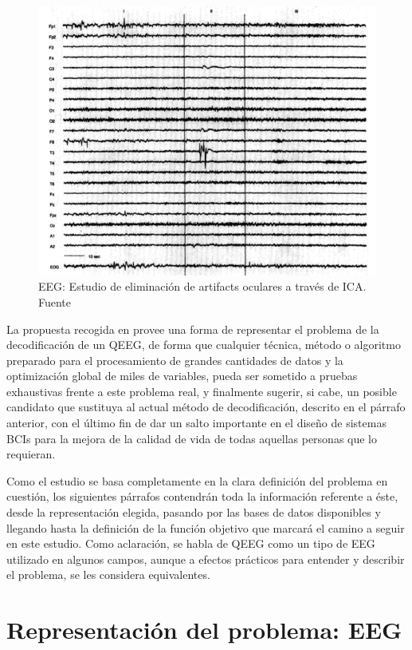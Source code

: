 \begin{figure}[h]
	\centering
	\includegraphics[scale=0.45]{imagenes/EEGData}
	\caption{EEG: Estudio de eliminación de artifacts oculares a través de ICA. Fuente \cite{EEG-Eye}} 
	\label{fig:EEGData}
\end{figure}

La propuesta recogida en \cite{EvolutionaryBigOpt} provee una forma de representar el problema de la decodificación de un QEEG, de forma que cualquier técnica, método o algoritmo preparado para el procesamiento de grandes cantidades de datos y la optimización global de miles de variables, pueda ser sometido a pruebas exhaustivas frente a este problema real, y finalmente sugerir, si cabe, un posible candidato que sustituya al actual método de decodificación, descrito en el párrafo anterior, con el último fin de dar un salto importante en el diseño de sistemas BCIs para la mejora de la calidad de vida de todas aquellas personas que lo requieran.

Como el estudio se basa completamente en la clara definición del problema en cuestión, los siguientes párrafos contendrán toda la información referente a éste, desde la representación elegida, pasando por las bases de datos disponibles y llegando hasta la definición de la función objetivo que marcará el camino a seguir en este estudio. Como aclaración, se habla de QEEG como un tipo de EEG utilizado en algunos campos, aunque a efectos prácticos para entender y describir el problema, se les considera equivalentes.

\section{Representación del problema: EEG}

